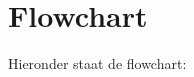 \documentclass[11pt,a4paper,oneside]{article}
\begin{document}
	
	\section{Flowchart}
	Hieronder staat de flowchart:
	
	
	
	\eerstefc
	\randomfc
\end{document}
